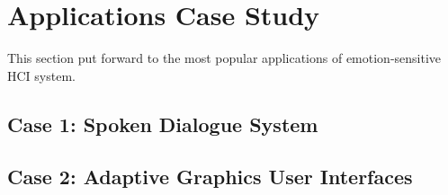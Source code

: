 \section{Applications Case Study}\label{sec:applications}

This section put forward to the most popular applications of emotion-sensitive HCI system.

\cite{Picard1999}

\subsection{Case 1: Spoken Dialogue System}

\cite{Conati2005, Hutchison2011}


\subsection{Case 2: Adaptive Graphics User Interfaces}


\cite{Dalvand, Galindo, Kaiser2006}
